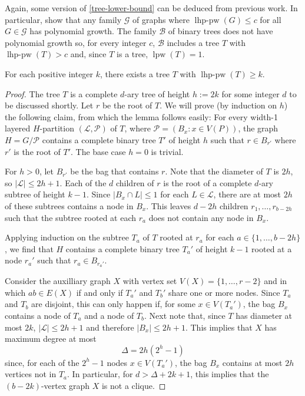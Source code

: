 \documentclass[kpfonts]{patmorin}
\DeclareMathOperator{\lpw}{lpw}
\DeclareMathOperator{\lhppw}{lhp-pw}
\begin{document}
Again, some version of \cref{tree-lower-bound} can be deduced from previous work. In particular, \citet{dvorak.huynh.ea:notes} show that any family $\mathcal{G}$ of graphs where $\lhppw(G)\le c$ for all $G\in\mathcal{G}$ has polynomial growth. The family $\mathcal{B}$ of binary trees does not have polynomial growth so, for every integer $c$, $\mathcal{B}$ includes a tree $T$ with $\lhppw(T)>c$ and, since $T$ is a tree, $\lpw(T)=1$.

\begin{lem}\label{tree-lower-bound}
  For each positive integer $k$, there exists a tree $T$ with $\lhppw(T)\ge k$.
\end{lem}

\begin{proof}
  The tree $T$ is a complete $d$-ary tree of height $h:=2k$ for some integer $d$ to be discussed shortly.  Let $r$ be the root of $T$.  We will prove (by induction on $h$) the following claim, from which the lemma follows easily: For every width-1 layered $H$-partition $(\mathcal{L},\mathcal{P})$ of $T$, where $\mathcal{P}=(B_x:x\in V(P))$, the graph $H=G/\mathcal{P}$ contains a complete binary tree $T'$ of height $h$ such that $r\in B_{r'}$ where $r'$ is the root of $T'$.  The base case $h=0$ is trivial.

  For $h>0$, let $B_{r'}$ be the bag that contains $r$.  Note that the diameter of $T$ is $2h$, so $|\mathcal{L}|\le 2h+1$.  Each of the $d$ children of $r$ is the root of a complete $d$-ary subtree of height $k-1$.
  Since $|B_x\cap L|\le 1$ for each $L\in\mathcal{L}$, there are at most $2h$ of these subtrees contains a node in $B_x$.  This leaves $d-2h$ children $r_1,\ldots,r_{b-2h}$ such that the subtree rooted at each $r_a$ does not contain any node in $B_x$.

  Applying induction on the subtree $T_a$ of $T$ rooted at $r_a$ for each $a\in\{1,\ldots,b-2h\}$, we find that $H$ contains a complete binary tree $T_a'$ of height $k-1$ rooted at a node $r_a'$ such that $r_a\in B_{r_a'}$.

  Consider the auxilliary graph $X$ with vertex set $V(X)=\{1,\ldots,r-2\}$ and in which $ab\in E(X)$ if and only if $T_a'$ and $T_b'$ share one or more nodes.  Since $T_a$ and $T_b$ are disjoint, this can only happen if, for some $x\in V(T_a')$, the bag $B_x$ contains a node of $T_a$ and a node of $T_b$.  Next note that, since $T$ has diameter at most $2k$, $|\mathcal{L}|\le 2h+1$ and therefore $|B_x|\le 2h+1$.  This implies that $X$ has maximum degree at most
  \[  \Delta = 2h(2^h-1)  \]
  since, for each of the $2^h-1$ nodes $x\in V(T_a')$, the bag $B_x$ contains at most $2h$ vertices not in $T_a$.  In particular, for $d> \Delta+2k+1$, this implies that the $(b-2k)$-vertex graph $X$ is not a clique.


\end{proof}
\end{document}
